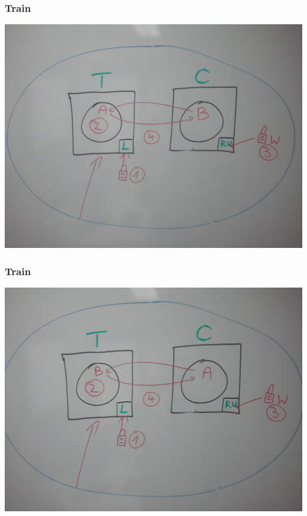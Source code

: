\documentclass{beamer}
\begin{document}
\begin{frame}
\frametitle{Train}
\begin{center}
\includegraphics[scale=0.1]{train2.jpg} 
\end{center}
\end{frame}

\begin{frame}
\frametitle{Train}
\begin{center}
\includegraphics[scale=0.1]{train3.jpg} 
\end{center}
\end{frame}
\end{document}
